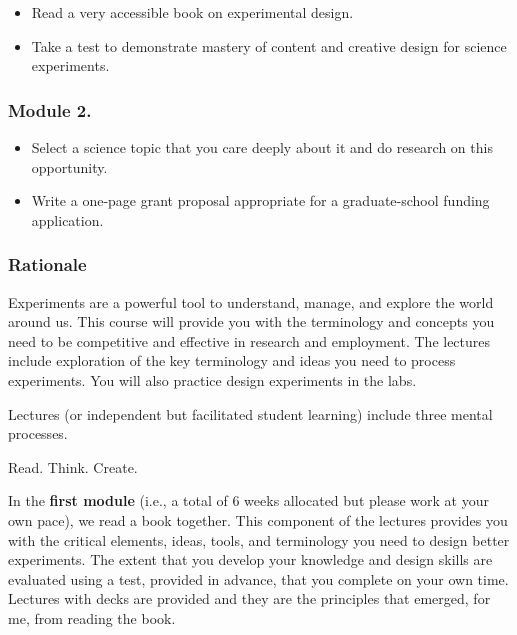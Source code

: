 \documentclass[
]{book}
\providecommand{\tightlist}{%
  \setlength{\itemsep}{0pt}\setlength{\parskip}{0pt}}
\begin{document}
\begin{itemize}
\tightlist
\item
  Read a very accessible book on experimental design.\\
\item
  Take a test to demonstrate mastery of content and creative design for science experiments.
\end{itemize}

\hypertarget{module-2.}{%
\subsubsection*{Module 2.}\label{module-2.}}

\begin{itemize}
\tightlist
\item
  Select a science topic that you care deeply about it and do research on this opportunity.\\
\item
  Write a one-page grant proposal appropriate for a graduate-school funding application.
\end{itemize}

\hypertarget{rationale}{%
\subsubsection*{Rationale}\label{rationale}}

Experiments are a powerful tool to understand, manage, and explore the world around us. This course will provide you with the terminology and concepts you need to be competitive and effective in research and employment. The lectures include exploration of the key terminology and ideas you need to process experiments. You will also practice design experiments in the labs.

Lectures (or independent but facilitated student learning) include three mental processes.

Read. Think. Create.

In the \textbf{first module} (i.e., a total of 6 weeks allocated but please work at your own pace), we read a book together. This component of the lectures provides you with the critical elements, ideas, tools, and terminology you need to design better experiments. The extent that you develop your knowledge and design skills are evaluated using a test, provided in advance, that you complete on your own time. Lectures with decks are provided and they are the principles that emerged, for me, from reading the book.
\end{document}
